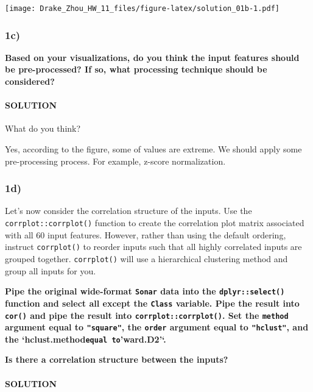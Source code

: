 \documentclass[
]{article}
\begin{document}
\texttt{[image: Drake\_Zhou\_HW\_11\_files/figure-latex/solution\_01b-1.pdf]}

\hypertarget{c}{%
\subsubsection{1c)}\label{c}}

\textbf{Based on your visualizations, do you think the input features
should be pre-processed? If so, what processing technique should be
considered?}

\hypertarget{solution-2}{%
\paragraph{SOLUTION}\label{solution-2}}

What do you think?

Yes, according to the figure, some of values are extreme. We should
apply some pre-processing process. For example, z-score normalization.

\hypertarget{d}{%
\subsubsection{1d)}\label{d}}

Let's now consider the correlation structure of the inputs. Use the
\texttt{corrplot::corrplot()} function to create the correlation plot
matrix associated with all 60 input features. However, rather than using
the default ordering, instruct \texttt{corrplot()} to reorder inputs
such that all highly correlated inputs are grouped together.
\texttt{corrplot()} will use a hierarchical clustering method and group
all inputs for you.

\textbf{Pipe the original wide-format \texttt{Sonar} data into the
\texttt{dplyr::select()} function and select all except the
\texttt{Class} variable. Pipe the result into \texttt{cor()} and pipe
the result into \texttt{corrplot::corrplot()}. Set the \texttt{method}
argument equal to \texttt{"square"}, the \texttt{order} argument equal
to \texttt{"hclust"}, and the
`hclust.method\texttt{equal\ to}'ward.D2'`.}

\textbf{Is there a correlation structure between the inputs?}

\hypertarget{solution-3}{%
\paragraph{SOLUTION}\label{solution-3}}
\end{document}
